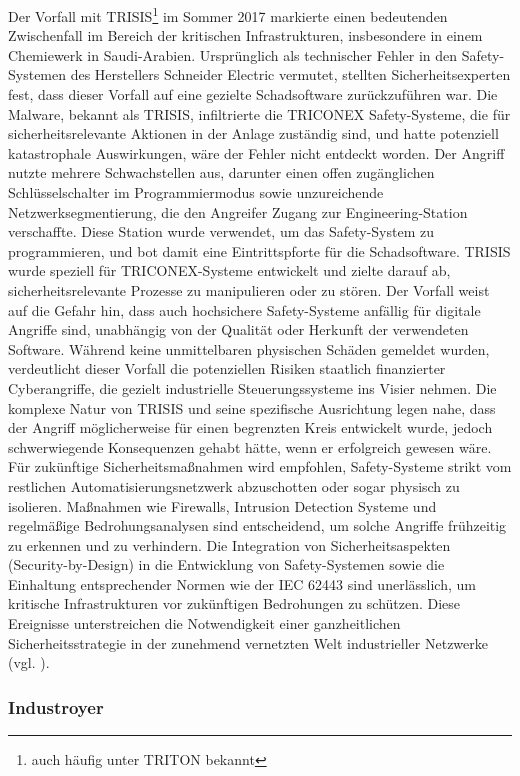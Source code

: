 Der Vorfall mit TRISIS\footnote{auch häufig unter TRITON bekannt} im Sommer 2017 markierte einen bedeutenden Zwischenfall im Bereich der kritischen Infrastrukturen, insbesondere in einem Chemiewerk in Saudi-Arabien. Ursprünglich als technischer Fehler in den Safety-Systemen des Herstellers Schneider Electric vermutet, stellten Sicherheitsexperten fest, dass dieser Vorfall auf eine gezielte Schadsoftware zurückzuführen war. Die Malware, bekannt als TRISIS, infiltrierte die TRICONEX Safety-Systeme, die für sicherheitsrelevante Aktionen in der Anlage zuständig sind, und hatte potenziell katastrophale Auswirkungen, wäre der Fehler nicht entdeckt worden. Der Angriff nutzte mehrere Schwachstellen aus, darunter einen offen zugänglichen Schlüsselschalter im Programmiermodus sowie unzureichende Netzwerksegmentierung, die den Angreifer Zugang zur Engineering-Station verschaffte. Diese Station wurde verwendet, um das Safety-System zu programmieren, und bot damit eine Eintrittspforte für die Schadsoftware. TRISIS wurde speziell für TRICONEX-Systeme entwickelt und zielte darauf ab, sicherheitsrelevante Prozesse zu manipulieren oder zu stören. Der Vorfall weist auf die Gefahr hin, dass auch hochsichere Safety-Systeme anfällig für digitale Angriffe sind, unabhängig von der Qualität oder Herkunft der verwendeten Software. Während keine unmittelbaren physischen Schäden gemeldet wurden, verdeutlicht dieser Vorfall die potenziellen Risiken staatlich finanzierter Cyberangriffe, die gezielt industrielle Steuerungssysteme ins Visier nehmen. Die komplexe Natur von TRISIS und seine spezifische Ausrichtung legen nahe, dass der Angriff möglicherweise für einen begrenzten Kreis entwickelt wurde, jedoch schwerwiegende Konsequenzen gehabt hätte, wenn er erfolgreich gewesen wäre. Für zukünftige Sicherheitsmaßnahmen wird empfohlen, Safety-Systeme strikt vom restlichen Automatisierungsnetzwerk abzuschotten oder sogar physisch zu isolieren. Maßnahmen wie Firewalls, Intrusion Detection Systeme und regelmäßige Bedrohungsanalysen sind entscheidend, um solche Angriffe frühzeitig zu erkennen und zu verhindern. Die Integration von Sicherheitsaspekten (Security-by-Design) in die Entwicklung von Safety-Systemen sowie die Einhaltung entsprechender Normen wie der IEC 62443 sind unerlässlich, um kritische Infrastrukturen vor zukünftigen Bedrohungen zu schützen. Diese Ereignisse unterstreichen die Notwendigkeit einer ganzheitlichen Sicherheitsstrategie in der zunehmend vernetzten Welt industrieller Netzwerke (vgl. \cite{TRISIS}).

\subsubsection{Industroyer}

